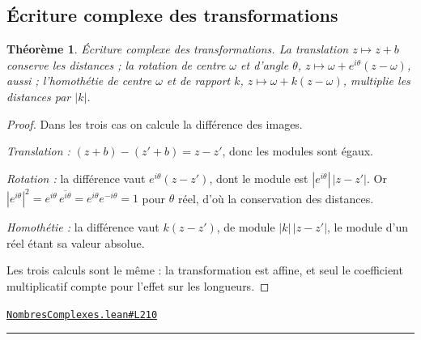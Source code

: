 \documentclass[11pt,a4paper]{article}
\theoremstyle{definition}
\theoremstyle{plain}
\newtheorem{theoreme}{Théorème}
\newcommand{\source}[2]{\par\smallskip\noindent\hfill{\footnotesize\href{#1}{\texttt{#2}}}\par\smallskip}
\begin{document}
\subsection{Écriture complexe des transformations}

\begin{theoreme}
Écriture complexe des transformations. La translation $z \mapsto z + b$ conserve les
distances ; la rotation de centre $\omega$ et d'angle $\theta$, $z \mapsto \omega +
e^{i\theta}(z - \omega)$, aussi ; l'homothétie de centre $\omega$ et de rapport $k$,
$z \mapsto \omega + k(z - \omega)$, multiplie les distances par $|k|$.
\end{theoreme}

\begin{proof}
Dans les trois cas on calcule la différence des images.

\emph{Translation :} $(z + b) - (z' + b) = z - z'$, donc les modules sont égaux.

\emph{Rotation :} la différence vaut $e^{i\theta}(z - z')$, dont le module est
$|e^{i\theta}|\,|z - z'|$. Or $|e^{i\theta}|^{2} = e^{i\theta}\,\overline{e^{i\theta}}
= e^{i\theta}e^{-i\theta} = 1$ pour $\theta$ réel, d'où la conservation des distances.

\emph{Homothétie :} la différence vaut $k(z - z')$, de module $|k|\,|z - z'|$, le module
d'un réel étant sa valeur absolue.

\medskip\noindent
Les trois calculs sont le même : la transformation est affine, et seul le coefficient
multiplicatif compte pour l'effet sur les longueurs.
\end{proof}
\source{https://github.com/Commutator-IO/learn-lean/blob/main/courses/02-lycee/07-nombres-complexes/NombresComplexes.lean\#L210}{NombresComplexes.lean\#L210}

\vfill
\noindent\rule{0.35\linewidth}{0.4pt}\par
{}
\end{document}
